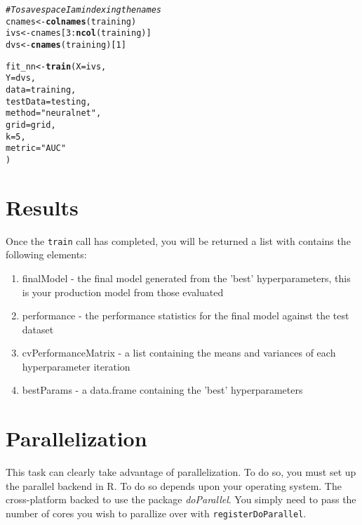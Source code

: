 \documentclass[12pt]{article}\usepackage[]{graphicx}\usepackage[]{color}
\makeatletter
\newcommand{\hlnum}[1]{\textcolor[rgb]{0.686,0.059,0.569}{#1}}%
\newcommand{\hlstr}[1]{\textcolor[rgb]{0.192,0.494,0.8}{#1}}%
\newcommand{\hlcom}[1]{\textcolor[rgb]{0.678,0.584,0.686}{\textit{#1}}}%
\newcommand{\hlopt}[1]{\textcolor[rgb]{0,0,0}{#1}}%
\newcommand{\hlstd}[1]{\textcolor[rgb]{0.345,0.345,0.345}{#1}}%
\newcommand{\hlkwb}[1]{\textcolor[rgb]{0.69,0.353,0.396}{#1}}%
\newcommand{\hlkwc}[1]{\textcolor[rgb]{0.333,0.667,0.333}{#1}}%
\newcommand{\hlkwd}[1]{\textcolor[rgb]{0.737,0.353,0.396}{\textbf{#1}}}%
\newenvironment{kframe}{%
 \def\at@end@of@kframe{}%
 \ifinner\ifhmode%
  \def\at@end@of@kframe{\end{minipage}}%
  \begin{minipage}{\columnwidth}%
 \fi\fi%
 \def\FrameCommand##1{\hskip\@totalleftmargin \hskip-\fboxsep
 \colorbox{shadecolor}{##1}\hskip-\fboxsep
     \hskip-\linewidth \hskip-\@totalleftmargin \hskip\columnwidth}%
 \MakeFramed {\advance\hsize-\width
   \@totalleftmargin\z@ \linewidth\hsize
   \@setminipage}}%
 {\par\unskip\endMakeFramed%
 \at@end@of@kframe}
\newenvironment{knitrout}{}{} %
\newcommand{\Rpackage}[1]{\textsl{#1}}
\newcommand{\Rcode}[1]{\texttt{#1}}
\newcommand{\Rfunction}[1]{\Rcode{#1}}
\makeatother
\begin{document}
\begin{knitrout}
\color{fgcolor}\begin{kframe}
\begin{alltt}
\hlcom{# To save space I am indexing the names}
\hlstd{cnames} \hlkwb{<-} \hlkwd{colnames}\hlstd{(training)}
\hlstd{ivs} \hlkwb{<-} \hlstd{cnames[}\hlnum{3}\hlopt{:}\hlkwd{ncol}\hlstd{(training)]}
\hlstd{dvs} \hlkwb{<-} \hlkwd{cnames}\hlstd{(training)[}\hlnum{1}\hlstd{]}

\hlstd{fit_nn} \hlkwb{<-} \hlkwd{train}\hlstd{(}\hlkwc{X} \hlstd{= ivs,}
                \hlkwc{Y} \hlstd{= dvs,}
                \hlkwc{data} \hlstd{= training,}
                \hlkwc{testData} \hlstd{= testing,}
                \hlkwc{method} \hlstd{=} \hlstr{"neuralnet"}\hlstd{,}
                \hlkwc{grid} \hlstd{= grid,}
                \hlkwc{k} \hlstd{=} \hlnum{5}\hlstd{,}
                \hlkwc{metric} \hlstd{=} \hlstr{"AUC"}
\hlstd{)}
\end{alltt}
\end{kframe}
\end{knitrout}

\maketitle
\section{Results}
Once the \Rfunction{train} call has completed, you will be returned a list with contains the following elements:

\begin{enumerate}
\item finalModel - the final model generated from the 'best' hyperparameters, this is your production model from those evaluated
\item performance - the performance statistics for the final model against the test dataset
\item cvPerformanceMatrix - a list containing the means and variances of each hyperparameter iteration
\item bestParams - a data.frame containing the 'best' hyperparameters
\end{enumerate}

\maketitle
\section{Parallelization}
This task can clearly take advantage of parallelization.  To do so, you must set up the parallel backend in R.
To do so depends upon your operating system.  The cross-platform backed to use the package \Rpackage{doParallel}.
You simply need to pass the number of cores you wish to parallize over with \Rfunction{registerDoParallel}.
\end{document}

